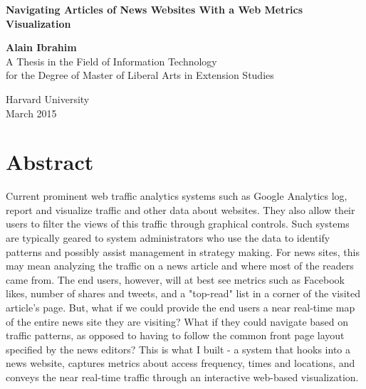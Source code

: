 \documentclass[12pt]{article}
\begin{document}

\begin{titlepage}
    \begin{center}
        
        \begin{doublespace}        
        \textbf{\Large Navigating Articles of News Websites With a Web Metrics Visualization}
        \vfill

        \vspace{2in}
        \textbf{\Large Alain Ibrahim} \\
		\vspace{2in}
        A Thesis in the Field of Information Technology \\
        for the Degree of Master of Liberal Arts in Extension Studies \\

        \vspace{.5in} 

        
        Harvard University \\
        \vspace {.4in}
        March 2015        

		\end{doublespace}        
        
        \vfill
         
    \end{center}
\end{titlepage}


\section{Abstract}

Current prominent web traffic analytics systems such as Google Analytics log, report and visualize traffic and other data about websites. They also allow their users to filter the views of this traffic through graphical controls. Such systems are typically geared to system administrators who use the data to identify patterns and possibly assist management in strategy making. For news sites, this may mean analyzing the traffic on a news article and where most of the readers came from. The end users, however, will at best see metrics such as Facebook likes, number of shares and tweets, and a "top-read" list in a corner of the visited article's page. But, what if we could provide the end users a near real-time map of the entire news site they are visiting? What if they could navigate based on traffic patterns, as opposed to having to follow the common front page layout specified by the news editors? This is what I built - a system that hooks into a news website, captures metrics about access frequency, times and locations, and conveys the near real-time traffic through an interactive web-based visualization.
\newpage
\end{document}

